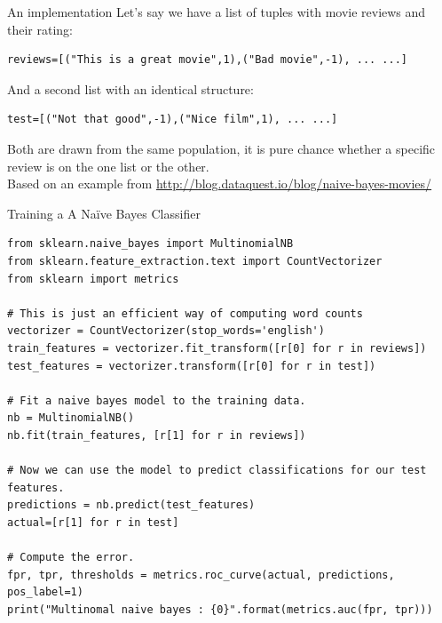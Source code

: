 \documentclass{beamer}
\begin{document}
\begin{frame}[fragile]{An implementation}
Let's say we have a list of tuples with movie reviews and their rating:
\begin{lstlisting}
reviews=[("This is a great movie",1),("Bad movie",-1), ... ...]
\end{lstlisting}
And a second list with an identical structure:
\begin{lstlisting}
test=[("Not that good",-1),("Nice film",1), ... ...]
\end{lstlisting}
Both are drawn from the same population, it is pure chance whether a specific review is on the one list or the other.\\
\tiny{Based on an example from \url{http://blog.dataquest.io/blog/naive-bayes-movies/}}
\end{frame}


\begin{frame}[fragile]{Training a A Naïve Bayes Classifier}
\begin{lstlisting}
from sklearn.naive_bayes import MultinomialNB
from sklearn.feature_extraction.text import CountVectorizer
from sklearn import metrics

# This is just an efficient way of computing word counts
vectorizer = CountVectorizer(stop_words='english')
train_features = vectorizer.fit_transform([r[0] for r in reviews])
test_features = vectorizer.transform([r[0] for r in test])

# Fit a naive bayes model to the training data.
nb = MultinomialNB()
nb.fit(train_features, [r[1] for r in reviews])

# Now we can use the model to predict classifications for our test features.
predictions = nb.predict(test_features)
actual=[r[1] for r in test]

# Compute the error.
fpr, tpr, thresholds = metrics.roc_curve(actual, predictions, pos_label=1)
print("Multinomal naive bayes : {0}".format(metrics.auc(fpr, tpr)))

\end{lstlisting}
\end{frame}
%
\end{document}
